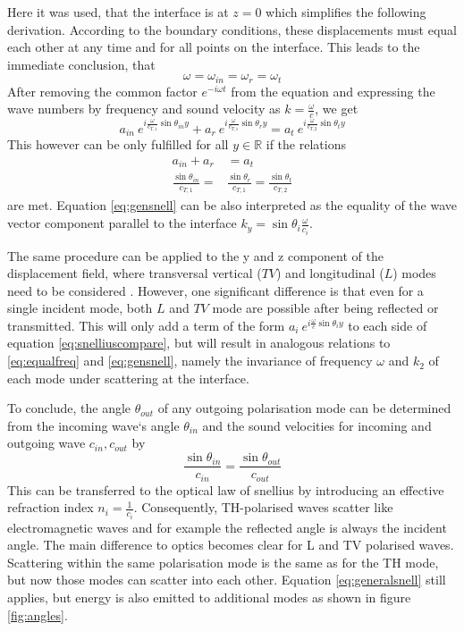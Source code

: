 Here it was used, that the interface is at $z=0$ which simplifies the following
derivation.
According to the boundary conditions, these displacements must equal each other
at any time and for all points on the interface. This leads to the immediate
conclusion, that
\begin{equation} \label{eq:equalfreq}
    \omega = \omega_{in} = \omega_r = \omega_t
\end{equation}
After removing the common factor $e^{-i\omega t}$ from the equation and
expressing the wave numbers by frequency and sound velocity as
$k = \frac{\omega}{c}$, we get
\begin{equation} \label{eq:snelliuscompare}
    a_{in}\ e^{i \frac{ \omega}{c_{T,1}}\sin\theta_{in} y}
    + a_{r}\ e^{i \frac{ \omega}{c_{T,1}}\sin\theta_{r} y}
    = a_{t}\ e^{i \frac{ \omega}{c_{T,2}}\sin\theta_{t} y}
\end{equation}
This however can be only fulfilled for all $y \in \mathbb{R}$ if the relations
\begin{align}
    a_{in} + a_r                      & = a_t                            \\
    \frac{\sin\theta_{in}}{c_{T,1}} = & \frac{\sin\theta_{r}}{c_{T,1}} =
    \frac{\sin\theta_{t}}{c_{T,2}} \label{eq:gensnell}
\end{align}
are met. Equation \ref{eq:gensnell} can be also interpreted as the equality
of the wave vector component parallel to the interface
$k_y=\sin\theta_i \frac{\omega}{c_i}$.

The same procedure can be applied to the y and z component of the displacement
field, where transversal vertical ($TV$) and longitudinal ($L$) modes need to
be considered \cite[185]{achenbach1973wave}. However, one significant
difference is that even for a single incident mode, both $L$ and $TV$ mode are
possible after being reflected or transmitted. This will only add a term of the
form $ a_{i}\ e^{i \frac{ \omega}{c}\sin\theta_{i} y}$ to each side of equation
\ref{eq:snelliuscompare}, but will result in analogous relations to
\ref{eq:equalfreq} and \ref{eq:gensnell}, namely the invariance of frequency
$\omega$ and $k_2$ of each mode under scattering at the interface.

To conclude, the angle $\theta_{out}$ of any outgoing polarisation mode can be
determined from the incoming wave`s angle $\theta_{in}$ and the sound
velocities for incoming and outgoing wave $c_{in}, c_{out}$ by
\begin{equation} \label{eq:generalsnell}
    \frac{\sin\theta_{in}}{c_{in}} =  \frac{\sin\theta_{out}}{c_{out}}
\end{equation}
This can be transferred to the optical law of snellius by introducing an
effective refraction index $n_i = \frac{1}{c_i}$. Consequently, TH-polarised
waves scatter like electromagnetic waves and for example the reflected angle is
always the incident angle.
The main difference to optics becomes clear for L and TV polarised waves.
Scattering within the same polarisation mode is the same as for the TH mode,
but now those modes can scatter into each other. Equation \ref{eq:generalsnell}
still applies, but energy is also emitted to additional modes as shown in
figure \ref{fig:angles}.

